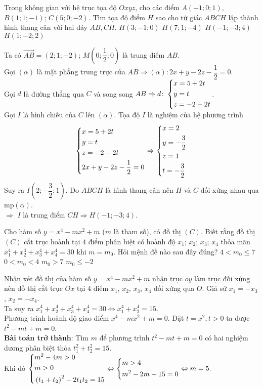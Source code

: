 \begin{ex}%
Trong không gian với hệ trục tọa độ $ Oxyz $, cho các điểm $ A(-1;0;1) $, $ B(1;1;-1) $; $ C(5;0;-2) $. Tìm tọa độ điểm $ H $ sao cho tứ giác $ ABCH $ lập thành hình thang cân với hai đáy $ AB, CH $.
	\choice
	{$ H(3;-1;0) $}
	{$ H(7;1;-4) $}
	{\True $ H(-1;-3;4) $}
	{$ H(1;-2;2) $}
	\loigiai
	{Ta có $ \vec{AB} = (2;1; -2) $; $ M\left(0;\dfrac{1}{2};0\right) $ là trung điểm $ AB $.\\
		Gọi $ (\alpha) $ là mặt phẳng trung trực của $ AB \Rightarrow (\alpha)\colon 2x + y -2z - \dfrac{1}{2} = 0.$ \\
		Gọi $ d $ là đường thẳng qua $ C $ và song song $ AB  \Rightarrow d\colon \left\{\begin{aligned}&x = 5 + 2t\\&y = t\\&z = -2 - 2t\end{aligned}\right.$.\\
		Gọi $ I $ là hình chiếu của $ C $ lên $ (\alpha) $. Tọa độ $ I $ là nghiệm của hệ phương trình $$\left\{\begin{aligned}&x = 5 + 2t\\&y = t\\&z = -2 - 2t\\&2x + y -2z - \dfrac{1}{2} = 0\end{aligned}\right. \Rightarrow \left\{\begin{aligned}&x = 2\\&y = -\dfrac{3}{2}\\&z = 1\\&t = -\dfrac{3}{2}\end{aligned}\right.$$
	Suy ra $ I\left(2; -\dfrac{3}{2};1\right) $.
	Do $ ABCH  $ là hình thang cân nên $ H $ và $ C $ đối xứng nhau qua mp$ (\alpha)$.\\ $\Rightarrow$ $I$ là trung điểm $ CH $$ \Rightarrow  $$ H(-1;-3;4) $. 
		
	}
\end{ex}
\begin{ex}%
Cho hàm số $ y = x^4 - mx^2 + m $	($ m $ là tham số), có đồ thị $ (C) $. Biết rằng đồ thị $ (C) $ cắt trục hoành tại $ 4 $ điểm phân biệt có hoành độ $ x_1 $; $ x_2 $; $ x_3 $; $ x_4 $ thỏa mãn $ x_1^4 + x_2^4 +x_3^4+x_4^4 =30$ khi $ m = m_0 $. Hỏi mệnh đề nào sau đây đúng?
	\choice
	{\True $ 4 < m_0 \leq 7 $}
	{$ 0 < m_0 < 4 $}
	{$ m_0>7 $}
	{$ m_0 \leq -2 $}
	\loigiai
	{Nhận xét đồ thị của hàm số $ y = x^4 - mx^2 + m $ nhận trục $ oy $ làm trục đối xứng nên đồ thị cắt trục $ Ox $ tại $ 4 $ điểm $ x_1 $, $ x_2 $, $ x_3 $, $ x_4 $ đối xứng qua $ O $. 
		Giả sử $ x_1 = -x_3 $, $ x_2 = -x_4 $.\\
		Ta suy ra $ x_1^4 + x_2^4 +x_3^4+x_4^4 =30 \Leftrightarrow x_1^4 +x_2^4 = 15 $.\\
		Phương trình hoành độ giao điểm $x^4 - mx^2 + m = 0  $. Đặt $ t = x^2,t>0 $ ta được $ t^2 -mt + m = 0 $.\\
		\textbf{Bài toán trở thành}: Tìm $ m $ để phương trình $ t^2 -mt + m = 0 $ có hai nghiệm dương phân biệt thỏa $ t_1^2 +t_2^2 = 15. $\\
		Khi đó $ \left\{\begin{aligned}&m^2 - 4m >0 \\ & m > 0 \\ &\left(t_1+t_2\right)^2 -2t_1t_2 = 15\end{aligned}\right. \Leftrightarrow \left\{\begin{aligned}&m>4 \\& m^2 - 2m -15 = 0\end{aligned}\right. \Leftrightarrow m = 5. $
		
	}
\end{ex}
